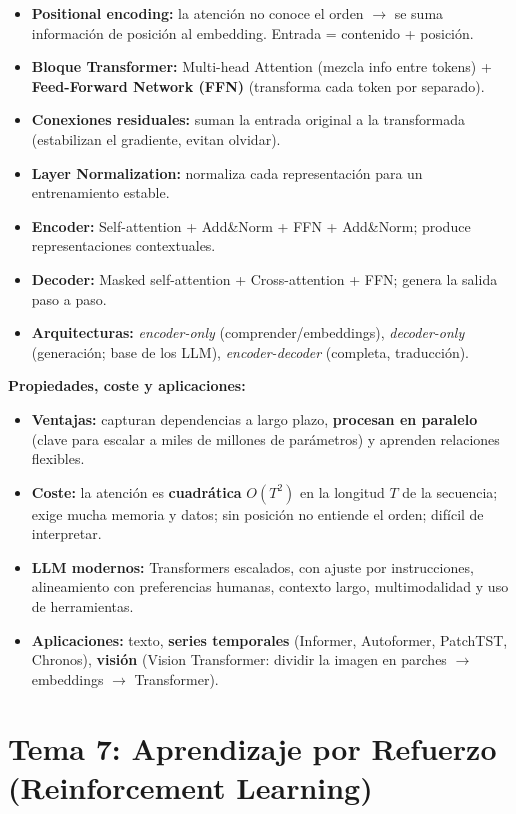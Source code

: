 \documentclass[12pt]{book} %
\providecommand{\tightlist}{%
  \setlength{\itemsep}{0pt}\setlength{\parskip}{0pt}}
\begin{document}
\begin{itemize}
\tightlist
\item
  \textbf{Positional encoding:} la atención no conoce el orden \(\to\)
  se suma información de posición al embedding. Entrada = contenido +
  posición.
\item
  \textbf{Bloque Transformer:} Multi-head Attention (mezcla info entre
  tokens) + \textbf{Feed-Forward Network (FFN)} (transforma cada token
  por separado).
\item
  \textbf{Conexiones residuales:} suman la entrada original a la
  transformada (estabilizan el gradiente, evitan olvidar).
\item
  \textbf{Layer Normalization:} normaliza cada representación para un
  entrenamiento estable.
\item
  \textbf{Encoder:} Self-attention + Add\&Norm + FFN + Add\&Norm;
  produce representaciones contextuales.
\item
  \textbf{Decoder:} Masked self-attention + Cross-attention + FFN;
  genera la salida paso a paso.
\item
  \textbf{Arquitecturas:} \emph{encoder-only} (comprender/embeddings),
  \emph{decoder-only} (generación; base de los LLM),
  \emph{encoder-decoder} (completa, traducción).
\end{itemize}

\textbf{Propiedades, coste y aplicaciones:}

\begin{itemize}
\tightlist
\item
  \textbf{Ventajas:} capturan dependencias a largo plazo,
  \textbf{procesan en paralelo} (clave para escalar a miles de millones
  de parámetros) y aprenden relaciones flexibles.
\item
  \textbf{Coste:} la atención es \textbf{cuadrática} \(O(T^2)\) en la
  longitud \(T\) de la secuencia; exige mucha memoria y datos; sin
  posición no entiende el orden; difícil de interpretar.
\item
  \textbf{LLM modernos:} Transformers escalados, con ajuste por
  instrucciones, alineamiento con preferencias humanas, contexto largo,
  multimodalidad y uso de herramientas.
\item
  \textbf{Aplicaciones:} texto, \textbf{series temporales} (Informer,
  Autoformer, PatchTST, Chronos), \textbf{visión} (Vision Transformer:
  dividir la imagen en parches \(\to\) embeddings \(\to\) Transformer).
\end{itemize}

\hypertarget{tema-7-aprendizaje-por-refuerzo-reinforcement-learning}{%
\section{Tema 7: Aprendizaje por Refuerzo (Reinforcement
Learning)}\label{tema-7-aprendizaje-por-refuerzo-reinforcement-learning}}
\end{document}
